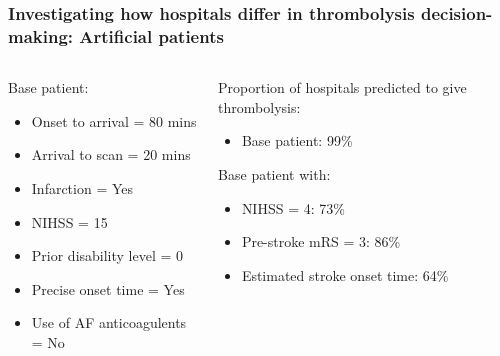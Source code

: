 \begin{frame}
\frametitle{Investigating how hospitals differ in thrombolysis decision-making: Artificial patients}

\vspace{3mm}

\begin{columns}[t]
    \begin{column}{0.45\textwidth}
        Base patient:
        \begin{itemize}
            \footnotesize
            \item Onset to arrival = 80 mins
            \item Arrival to scan = 20 mins
            \item Infarction = Yes
            \item NIHSS = 15
            \item Prior disability level = 0
            \item Precise onset time = Yes
            \item Use of AF anticoagulents = No
        \end{itemize}
    \end{column}
    
    \begin{column}{0.5\textwidth}
    Proportion of hospitals predicted to give thrombolysis:
    \footnotesize
    \begin{itemize}
        \item Base patient: 99\%
    \end{itemize}
    \pause{} %
    Base patient with:
    \begin{itemize}
        \item NIHSS = 4: 73\%
        \item Pre-stroke mRS = 3: 86\%
        \item Estimated stroke onset time: 64\%
    \end{itemize}
    \end{column}

\end{columns}
\end{frame}
